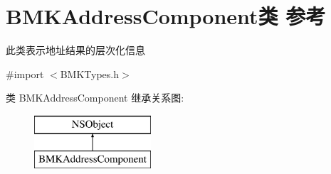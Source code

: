 \hypertarget{interface_b_m_k_address_component}{}\section{B\+M\+K\+Address\+Component类 参考}
\label{interface_b_m_k_address_component}


此类表示地址结果的层次化信息  




{\ttfamily \#import $<$B\+M\+K\+Types.\+h$>$}

类 B\+M\+K\+Address\+Component 继承关系图\+:\begin{figure}[H]
\begin{center}
\leavevmode
\includegraphics[height=2.000000cm]{interface_b_m_k_address_component}
\end{center}
\end{figure}
